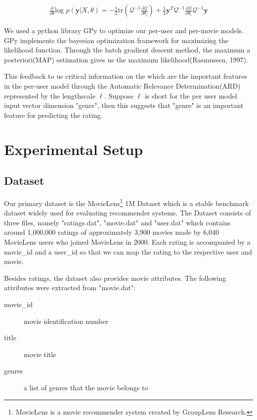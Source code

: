 \documentclass[letterpaper]{article}
\begin{document}
\begin{align*}
\frac{\partial}{\partial\theta}\text{log }p(\mathbf{y}|X,\theta) = -
\frac{1}{2}\text{tr}(\mathcal{Q}^{-1}
\frac{\partial\mathcal{Q}}{\partial\theta_{i}}) +
\frac{1}{2}\mathbf{y}^T\mathcal{Q}^{-1}
\frac{\partial\mathcal{Q}}{\partial\theta_{i}}
\mathcal{Q}^{-1}\mathbf{y}
\end{align*}

We used a python library GPy to optimize our per-user and per-movie models.
GPy implements the bayesian optimization framework for maximizing the likelihood function. Through the batch gradient descent method, the maximum a posteriori(MAP) estimation gives us the maximum likelihood(Rasmussen, 1997).

This feedback to us critical information on the which are the important features in the per-user model through the Automatic Relevance Determination(ARD) represented by the lengthscale $\ell$. Suppose $\ell$ is short for the per user model input vector dimension "genre", then this suggests that "genre" is an important feature for predicting the rating.

\section{Experimental Setup}
\subsection{Dataset}
Our primary dataset is the MovieLens\footnote{MovieLens is a movie recommender system created by GroupLens Research.}  1M Dataset which is a stable benchmark dataset widely used for evaluating recommender systems. The Dataset consists of three files, namely "ratings.dat", "movie.dat" and "user.dat" which contains around 1,000,000 ratings of approximately 3,900 movies made by 6,040 MovieLens users who joined MovieLens in 2000. Each rating is accompanied by a movie\_id and a user\_id so that we can map the rating to the respective user and movie.

Besides ratings, the dataset also provides movie attributes. The following attributes were extracted from "movie.dat":

\begin{description}
	\item[movie\_id] movie identification number
	\item[title] movie title
	\item[genres] a list of genres that the movie belongs to
\end{description}
\end{document}
